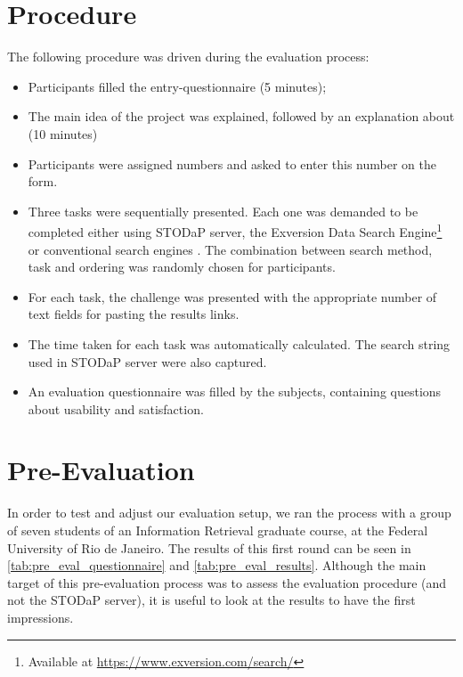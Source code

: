 \section{Procedure}

The following procedure was driven during the evaluation process:

\begin{itemize}
	\item Participants filled the entry-questionnaire (5 minutes);
	\item The main idea of the project was explained, followed by an explanation about (10 minutes)
	\item Participants were assigned numbers and asked to enter this number on the form. 
	\item Three tasks were sequentially presented. 
	Each one was demanded to be completed either using STODaP server, the Exversion Data Search Engine\footnote{Available at \url{https://www.exversion.com/search/}} or conventional search engines \cite{Xu2009}.
	The combination between search method, task and ordering was randomly chosen for participants.
	\item For each task, the challenge was presented with the appropriate number of text fields for pasting the results links.
	\item The time taken for each task was automatically calculated. The search string used in STODaP server were also captured.
	\item An evaluation questionnaire was filled by the subjects, containing questions about usability and satisfaction.
\end{itemize}

\section{Pre-Evaluation}
In order to test and adjust our evaluation setup, we ran the process with a group of seven students of an Information Retrieval graduate course, at the Federal University of Rio de Janeiro.
The results of this first round can be seen in \autoref{tab:pre_eval_questionnaire} and \autoref{tab:pre_eval_results}.
Although the main target of this pre-evaluation process was to assess the evaluation procedure (and not the STODaP server), it is useful to look at the results to have the first impressions.

